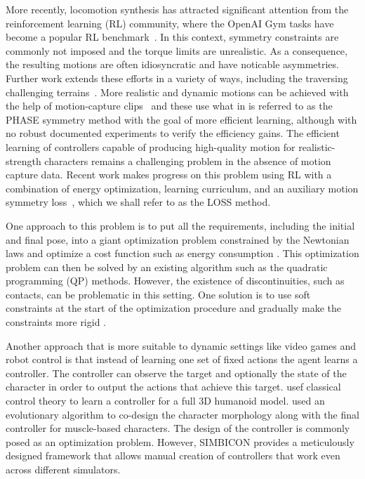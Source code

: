More recently, locomotion synthesis has attracted significant
attention from the reinforcement learning (RL) community, where the OpenAI Gym tasks have 
become a popular RL benchmark~\cite{ref:OpenAI-Gym}. In this context, symmetry constraints are commonly 
not imposed and the torque limits are unrealistic. As a consequence, the resulting motions are often idiosyncratic and have noticable asymmetries.
Further work extends these efforts in a variety of ways, including the traversing challenging terrains~\cite{ref:deepmindParkour}.
More realistic and dynamic motions can be achieved with the help of motion-capture clips~\cite{2017-TOG-deepLoco,2018-TOG-deepMimic} and these use what in  is referred to as the PHASE symmetry method with the goal of more efficient learning, although with
no robust documented experiments to verify the efficiency gains.
The efficient learning of controllers capable of producing high-quality motion for realistic-strength characters remains
a challenging problem in the absence of motion capture data. Recent work makes
progress on this problem using RL with a combination of energy optimization, learning curriculum, and 
an auxiliary motion symmetry loss~\cite{Yu-SIGGRAPH-2018}, which we shall refer to as the LOSS method.
% 


One approach to this problem is to put all the requirements, including the initial and final pose, into a giant optimization problem constrained by the Newtonian laws and optimize a cost function such as energy consumption \cite{spacetime_constraints_luxo}. This optimization problem can then be solved by an existing algorithm such as the quadratic programming (QP) methods. However, the existence of discontinuities, such as contacts, can be problematic in this setting. One solution is to use soft constraints at the start of the optimization procedure and gradually make the constraints more rigid \cite{Mordatch:2012:DCB:2185520.2185539}.

Another approach that is more suitable to dynamic settings like video games and robot control is that instead of learning one set of fixed actions the agent learns a controller. The controller can observe the target and optionally the state of the character in order to output the actions that achieve this target. \citeauthor{Tassa2014ControllimitedDD} usef classical control theory to learn a controller for a full 3D humanoid model. \citeauthor{2013-TOG-MuscleBasedBipeds} used an evolutionary algorithm to co-design the character morphology along with the final controller for muscle-based characters. The design of the controller is commonly posed as an optimization problem. However, SIMBICON \cite{Yin07} provides a meticulously designed framework that allows manual creation of controllers that work even across different simulators.

